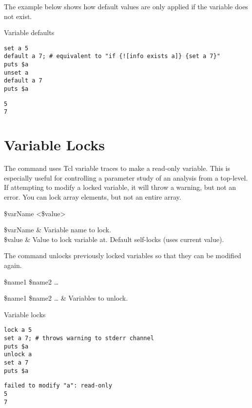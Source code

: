 \documentclass{article}
\begin{document}
The example below shows how default values are only applied if the variable does not exist.

\begin{example}{Variable defaults}
\begin{lstlisting}
set a 5
default a 7; # equivalent to "if {![info exists a]} {set a 7}"
puts $a
unset a
default a 7
puts $a
\end{lstlisting}
\tcblower
\begin{lstlisting}
5
7
\end{lstlisting}
\end{example}
\clearpage
\section{Variable Locks}
The command  uses Tcl variable traces to make a read-only variable. 
This is especially useful for controlling a parameter study of an analysis from a top-level.
If attempting to modify a locked variable, it will throw a warning, but not an error.
You can lock array elements, but not an entire array.

\begin{syntax}
 \$varName <\$value>
\end{syntax}
\begin{args}
\$varName & Variable name to lock.  \\
\$value & Value to lock variable at. Default self-locks (uses current value).
\end{args}

The command  unlocks previously locked variables so that they can be modified again.

\begin{syntax}
 \$name1 \$name2 …
\end{syntax}
\begin{args}
\$name1 \$name2 … & Variables to unlock.
\end{args}

\begin{example}{Variable locks}
\begin{lstlisting}
lock a 5
set a 7; # throws warning to stderr channel
puts $a
unlock a
set a 7
puts $a
\end{lstlisting}
\tcblower
\begin{lstlisting}
failed to modify "a": read-only
5
7
\end{lstlisting}
\end{example}
\end{document}
